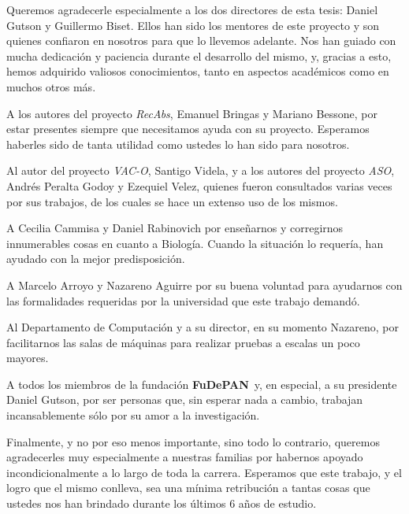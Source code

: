 \documentclass[a4paper,12pt,english]{report}
\theoremstyle{definition}
\newcommand{\fudepan}{\textbf{FuDePAN}}
\begin{document}
Queremos agradecerle especialmente a los dos directores de esta tesis: Daniel Gutson y Guillermo Biset. Ellos han sido los mentores de este proyecto y son quienes confiaron en nosotros para que lo llevemos adelante. Nos han guiado con mucha dedicaci\'on y paciencia durante el desarrollo del mismo, y, gracias a esto, hemos adquirido valiosos conocimientos, tanto en aspectos acad\'emicos como en muchos otros m\'as.

A los autores del proyecto \emph{RecAbs}, Emanuel Bringas y Mariano Bessone, por estar presentes siempre que necesitamos ayuda con su proyecto.
Esperamos haberles sido de tanta utilidad como ustedes lo han sido para nosotros.

Al autor del proyecto \emph{VAC-O}, Santigo Videla, y a los autores del proyecto \emph{ASO}, Andr\'es Peralta Godoy y Ezequiel Velez, quienes fueron
consultados varias veces por sus trabajos, de los cuales se hace un extenso uso de los mismos.

A Cecilia Cammisa y Daniel Rabinovich por ense\~narnos y corregirnos innumerables cosas en cuanto a Biolog\'ia. Cuando la situaci\'on lo requer\'ia, 
han ayudado con la mejor predisposici\'on.

A Marcelo Arroyo y Nazareno Aguirre por su buena voluntad para ayudarnos con las formalidades requeridas por la universidad que este trabajo
demand\'o.

Al Departamento de Computaci\'on y a su director, en su momento Nazareno, por facilitarnos las salas de m\'aquinas para realizar pruebas a escalas un
poco mayores.

A todos los miembros de la fundaci\'on \fudepan\ y, en especial, a su presidente Daniel Gutson, por ser personas que, sin esperar nada a cambio,
trabajan incansablemente s\'olo por su amor a la investigaci\'on.

Finalmente, y no por eso menos importante, sino todo lo contrario, queremos agradecerles muy especialmente a nuestras familias por habernos apoyado incondicionalmente a lo largo de toda la carrera. Esperamos que este trabajo, y el logro que el mismo conlleva, sea una m\'inima retribuci\'on a tantas cosas que ustedes nos han brindado durante los \'ultimos 6 a\~nos de estudio.

\newpage

\tableofcontents

\newpage

\listoffigures

\newpage

\listoftables
\end{document}
